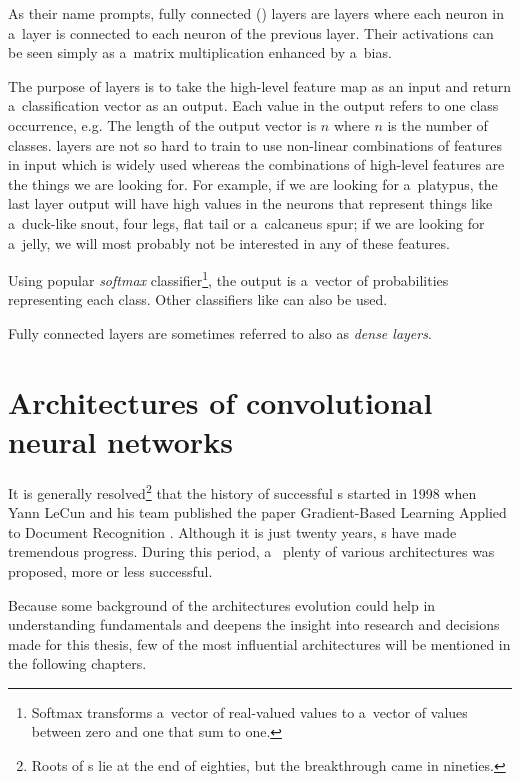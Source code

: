 As their name prompts, fully connected () layers are layers where each 
neuron in a~layer is connected to each neuron of the previous layer. Their 
activations can be seen simply as a~matrix multiplication enhanced by a~bias.  

The purpose of  layers is to take the high-level feature map as an input 
and return a~classification vector as an output. Each value in the output refers 
to one class occurrence, e.g. The length of the output vector is $n$ where $n$ 
is the number of classes.  layers are not so hard to train to use 
non-linear combinations of features in input which is widely used whereas the 
combinations of high-level features are the things we are looking for. For 
example, if we are looking for a~platypus, the last layer output will have high 
values in the neurons that represent things like a~duck-like snout, four legs, 
flat tail or a~calcaneus spur; if we are looking for a~jelly, we will most 
probably not be interested in any of these features. 

Using popular \textit{softmax} classifier\footnote{Softmax transforms a~vector 
of real-valued values to a~vector of values between zero and one that sum to 
one.}, the output is a~vector of probabilities representing each class. Other 
classifiers like  can also be used. 

Fully connected layers are sometimes referred to also as \textit{dense layers}.

\section{Architectures of convolutional neural networks}
\label{cnn-architectures}

It is generally resolved\footnote{Roots of s lie at the end of eighties, 
but the breakthrough came in nineties.} that the history of successful s 
started in 1998 when Yann LeCun and his team published the paper Gradient-Based 
Learning Applied to Document Recognition \cite{lenet5}. Although it is just 
twenty years, s have made tremendous progress. During this period, a~
plenty of various architectures was proposed, more or less successful.

Because some background of the  architectures evolution could help in 
understanding  fundamentals and deepens the insight into research and 
decisions made for this thesis, few of the most influential architectures will be 
mentioned in the following chapters.

